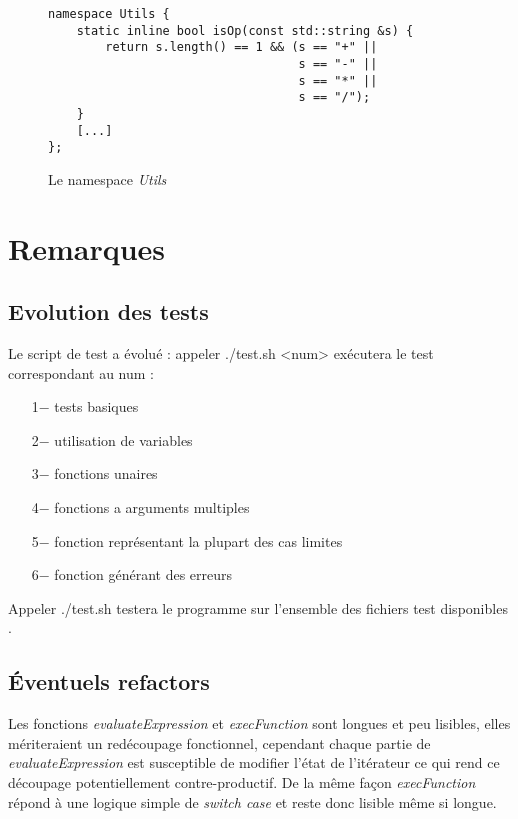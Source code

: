 \documentclass[]{article}
\begin{document}
\begin{figure}[h]
\centering
\begin{lstlisting}
namespace Utils {
	static inline bool isOp(const std::string &s) {
		return s.length() == 1 && (s == "+" ||
								   s == "-" ||
								   s == "*" ||
								   s == "/");
	}
	[...]
};
\end{lstlisting}
\caption{Le namespace \textit{Utils}}
\end{figure}

\section{Remarques}
\subsection{Evolution des tests}
Le script de test a évolué : 
appeler ./test.sh <num> exécutera le test correspondant au num :
\begin{itemize}
\item[\hspace{.5cm}1$-$]tests basiques
\item[\hspace{.5cm}2$-$]utilisation de variables
\item[\hspace{.5cm}3$-$]fonctions unaires
\item[\hspace{.5cm}4$-$]fonctions a arguments multiples
\item[\hspace{.5cm}5$-$]fonction représentant la plupart des cas limites
\item[\hspace{.5cm}6$-$]fonction générant des erreurs
\end{itemize}\bigskip
Appeler ./test.sh testera le programme sur l'ensemble des fichiers test disponibles .

\subsection{Éventuels refactors}
Les fonctions \textit{evaluateExpression} et \textit{execFunction} sont longues et peu lisibles, elles mériteraient un redécoupage fonctionnel, cependant chaque partie de \textit{evaluateExpression} est susceptible de modifier l'état de l'itérateur ce qui rend ce découpage potentiellement contre-productif. De la même façon \textit{execFunction} répond à une logique simple de \textit{switch case} et reste donc lisible même si longue.
\end{document}
